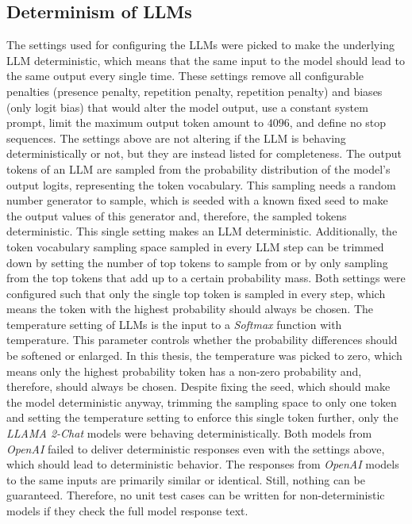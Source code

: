 \documentclass[draft,final]{thesisclass} %
\begin{document}
\subsection{Determinism of \acs{LLM}s}
The settings used for configuring the \acs{LLM}s were picked to make the underlying \acs{LLM} deterministic, which means that the same input to the model should lead to the same output every single time.
These settings remove all configurable penalties (presence penalty, repetition penalty, repetition penalty) and biases (only logit bias) that would alter the model output, use a constant system prompt, limit the maximum output token amount to $4096$, and define no stop sequences.
The settings above are not altering if the \acs{LLM} is behaving deterministically or not, but they are instead listed for completeness.
The output tokens of an \acs{LLM} are sampled from the probability distribution of the model's output logits, representing the token vocabulary.
This sampling needs a random number generator to sample, which is seeded with a known fixed seed to make the output values of this generator and, therefore, the sampled tokens deterministic.
This single setting makes an \acs{LLM} deterministic.
Additionally, the token vocabulary sampling space sampled in every \acs{LLM} step can be trimmed down by setting the number of top tokens to sample from or by only sampling from the top tokens that add up to a certain probability mass.
Both settings were configured such that only the single top token is sampled in every step, which means the token with the highest probability should always be chosen.
The temperature setting of \acs{LLM}s is the input to a \textit{Softmax} function with temperature. This parameter controls whether the probability differences should be softened or enlarged.
In this thesis, the temperature was picked to zero, which means only the highest probability token has a non-zero probability and, therefore, should always be chosen.
Despite fixing the seed, which should make the model deterministic anyway, trimming the sampling space to only one token and setting the temperature setting to enforce this single token further, only the \textit{LLAMA 2-Chat} models were behaving deterministically.
Both models from \textit{OpenAI} failed to deliver deterministic responses even with the settings above, which should lead to deterministic behavior.
The responses from \textit{OpenAI} models to the same inputs are primarily similar or identical. Still, nothing can be guaranteed. Therefore, no unit test cases can be written for non-deterministic models if they check the full model response text.
\end{document}
